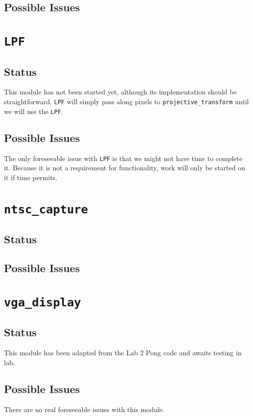 \documentclass{article}
\begin{document}
\subsection{Possible Issues}

\section{{\tt LPF}}
\subsection{Status} This module has not been started yet, although its implementation should be straightforward. {\tt LPF} will simply pass along pixels to {\tt projective\_transform} until we will use the {\tt LPF}.
\subsection{Possible Issues} The only foreseeable issue with {\tt LPF} is that we might not have time to complete it. Because it is not a requirement for functionality, work will only be started on it if time permits.

\section{{\tt ntsc\_capture}}
\subsection{Status} 
\subsection{Possible Issues}

\section{{\tt vga\_display}}
\subsection{Status} This module has been adapted from the Lab 2 Pong code and awaits testing in lab.
\subsection{Possible Issues} There are no real foreseeable issues with this module.
\end{document}
